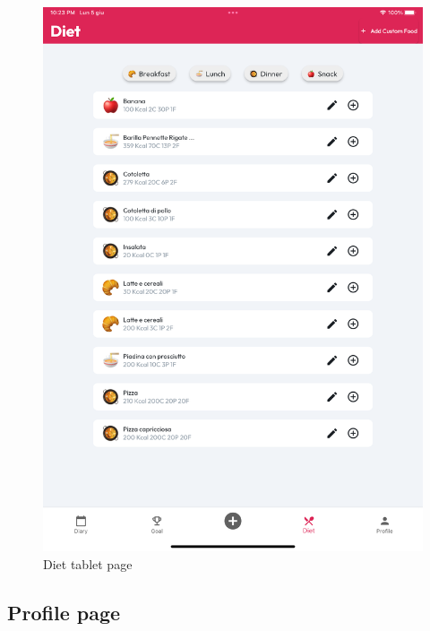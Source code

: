 \documentclass{Configuration_Files/PoliMi3i_thesis}
\begin{document}
\begin{figure}[!h]
  \includegraphics[scale=0.1]{Images/Screenshots/Tablet/DietTabletLight.png}
  \caption{Diet tablet page}
\end{figure}

\clearpage

\subsection{Profile page}
\end{document}
